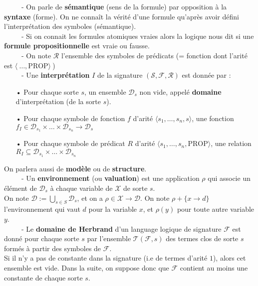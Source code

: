 \documentclass[11pt,a4paper]{article}
\begin{document}
\ \ \ \ \ - On parle de \textbf{sémantique} (sens de la formule) par opposition à la \textbf{syntaxe}
(forme). On ne connaît la vérité d’une formule qu’après avoir défini l’interprétation
des symboles (sémantique). \\

\ \ \ \ \ - Si on connait les formules atomiques vraies alors la logique nous dit si
une \textbf{formule propositionnelle} est vraie ou fausse. \\

\ \ \ \ \ - On note $\mathcal{R}$ l'ensemble des symboles de prédicats (= fonction dont l'arité est $\langle \ \dots , \text{PROP} \rangle \ $) \\

\ \ \ \ \ - Une \textbf{interprétation} $I$ de la signature $(\mathcal{S},\mathcal{F},\mathcal{R})$ est donnée par :

\begin{itemize}
\item[•] Pour chaque sorte $s$, un ensemble $\mathcal{D}_s$ non vide, appelé \textbf{domaine} d'interprétation (de la sorte $s$).
\item[•] Pour chaque symbole de fonction $f$ d'arité $\langle s_1, \dots,s_n ,s \rangle $, une fonction $f_I \in \mathcal{D}_{s_1} \times \dots \times \mathcal{D}_{s_n} \to \mathcal{D}_{s}$
\item[•] Pour chaque symbole de prédicat $R$ d'arité $\langle s_1, \dots,s_n , \text{PROP} \rangle $, une relation $R_I \subseteq \mathcal{D}_{s_1} \times \dots \times \mathcal{D}_{s_n}$
\end{itemize}

On parlera aussi de \textbf{modèle} ou de \textbf{structure}. \\

\ \ \ \ \ - Un \textbf{environnement} (ou \textbf{valuation}) est une application $\rho$ qui associe un élément de $\mathcal{D}_s$ à chaque variable de $\mathcal{X}$ de sorte $s$. \\
On note $\mathcal{D} := \bigcup\limits_{s \in S} \mathcal{D}_s$, et on a $\rho \in \mathcal{X} \to \mathcal{D}$. On note $\rho+\{x\to d\}$ l'environnement qui vaut $d$ pour la variable $x$, et $\rho(y)$ pour toute autre variable $y$. \\

\ \ \ \ \ - Le \textbf{domaine de Herbrand} d'un language logique de signature $\mathcal{F}$ est donné pour chaque sorte $s$ par l'ensemble $\mathcal{T}(\mathcal{F},s)$ des termes clos de sorte $s$ formés à partir des symboles de $\mathcal{F}$. \\
Si il n'y a pas de constante dans la signature (i.e de termes d'arité $1$), alors cet ensemble est vide. Dans la suite, on suppose donc que $\mathcal{F}$ contient au moins une constante de chaque sorte $s$. \\
\end{document}

